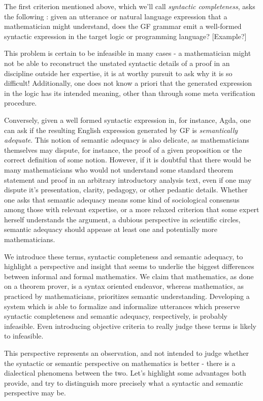 The first criterion mentioned above, which we'll call \emph{syntactic completeness}, asks the
following : given an utterance or natural language expression that a
mathematician might understand, does the GF grammar emit a well-formed syntactic
expression in the target logic or programming language? [Example?]

This problem is certain to be infeasible in many cases - a mathematician might
not be able to reconstruct the unstated syntactic details of a proof in an
discipline outside her expertise, it is at worthy pursuit to ask why it is so
difficult! Additionally, one does not know a priori that the generated
expression in the logic has its intended meaning, other than through some meta
verification procedure.

Conversely, given a well formed syntactic expression in, for instance, Agda, one
can ask if the resulting English expression generated by GF is
\emph{semantically adequate}. This notion of semantic adequacy is also delicate,
as mathematicians themselves may dispute, for instance, the proof of a given
proposition or the correct definition of some notion. However, if it is doubtful
that there would be many mathematicians who would not understand some standard
theorem statement and proof in an arbitrary introductory analysis text, even if
one may dispute it's presentation, clarity, pedagogy, or other pedantic details.
Whether one asks that semantic adequacy means some kind of sociological
consensus among those with relevant expertise, or a more relaxed criterion that
some expert herself understands the argument, a dubious perspective in
scientific circles, semantic adequacy should appease at least one and
potentially more mathematicians.

We introduce these terms, syntactic completeness and semantic adequacy, to
highlight a perspective and insight that seems to underlie the biggest
differences between informal and formal mathematics. We claim that mathematics,
as done on a theorem prover, is a syntax oriented endeavor, whereas mathematics,
as practiced by mathematicians, prioritizes semantic understanding. Developing a
system which is able to formalize and informalize utterances which preserve 
syntactic completeness and semantic adequacy, respectively, is
probably infeasible. Even introducing objective criteria to really judge these
terms is likely to infeasible.

This perspective represents an observation, and not intended to judge whether
the syntactic or semantic perspective on mathematics is better - there is a
dialectical phenomena between the two. Let's highlight some advantages both
provide, and try to distinguish more precisely what a syntactic and semantic
perspective may be.

